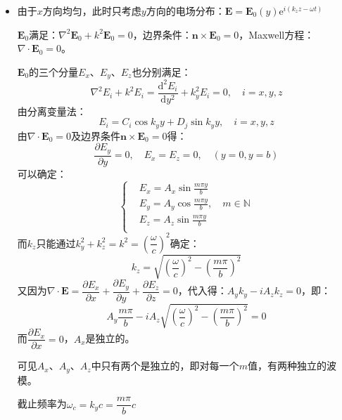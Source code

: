 \documentclass[a4paper,fontset=none]{ctexart}
\begin{document}
\begin{itemize}
    \item[14.]
    由于$x$方向均匀，此时只考虑$y$方向的电场分布：$\bm{E}=\bm{E}_0(y)\mathrm{e}^{i(k_z z-\omega t)}$

    $\bm{E}_0$满足：$\nabla^2\bm{E}_0+k^2\bm{E}_0=0$，边界条件：$\bm{n}\times\bm{E}_0=0$，Maxwell方程：$\nabla\cdot\bm{E}_0=0$。

    $\bm{E}_0$的三个分量$E_x$、$E_y$、$E_z$也分别满足：
    \[
        \nabla^2E_i + k^2E_i = \frac{\mathrm{d}^2E_i}{\mathrm{d}y^2} + k_y^2E_i = 0,\quad i = x,y,z
    \]
    由分离变量法：
    \[
        E_i = C_i\cos k_y y + D_j\sin k_y y,\quad i = x,y,z
    \]
    由$\nabla\cdot\bm{E}_0=0$及边界条件$\bm{n}\times\bm{E}_0=0$得：
    \[
        \frac{\partial E_y}{\partial y} = 0,\quad E_x = E_z = 0,\quad (y=0,y=b)
    \]
    可以确定：
    \[
        \left\{
        \begin{aligned}
            & E_x = A_x\sin\frac{m\pi y}{b} \\
            & E_y = A_y\cos\frac{m\pi y}{b},\quad m\in\mathbb{N} \\
            & E_z = A_z\sin\frac{m\pi y}{b} \\
        \end{aligned}
        \right.
    \]
    而$k_z$只能通过$k_y^2+k_z^2=k^2=\left(\dfrac{\omega}{c}\right)^2$确定：
    \[
        k_z=\sqrt{\left(\frac{\omega}{c}\right)^2-\left(\frac{m\pi}{b}\right)^2}
    \]
    又因为$\nabla\cdot\bm{E}=\dfrac{\partial E_x}{\partial x}+\dfrac{\partial E_y}{\partial y}+\dfrac{\partial E_z}{\partial z}=0$，代入得：$A_y k_y - iA_z k_z=0$，即：
    \[
        A_y\frac{m\pi}{b} - iA_z\sqrt{\left(\frac{\omega}{c}\right)^2-\left(\frac{m\pi}{b}\right)^2} = 0
    \]
    而$\dfrac{\partial E_x}{\partial x}=0$，$A_x$是独立的。

    可见$A_x$、$A_y$、$A_z$中只有两个是独立的，即对每一个$m$值，有两种独立的波模。

    截止频率为$\omega_c=k_y c=\dfrac{m\pi}{b}c$


\end{itemize}
\end{document}

